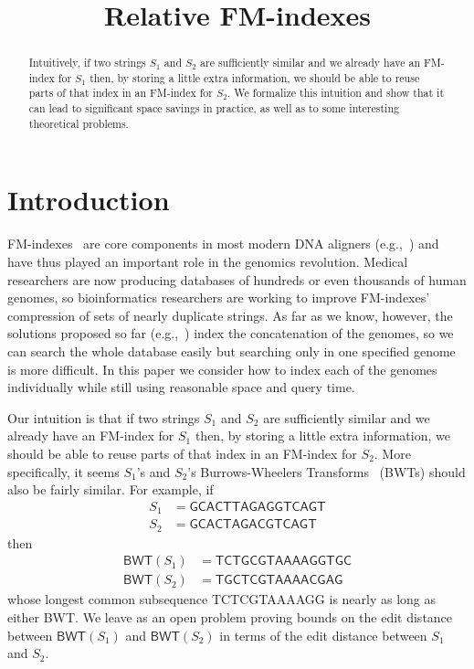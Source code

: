 \documentclass{llncs}
\newcommand{\BWT}
  {\ensuremath{\mathsf{BWT}}}
\begin{document}
\title{Relative FM-indexes}
\maketitle

\begin{abstract}
Intuitively, if two strings $S_1$ and $S_2$ are sufficiently similar and we already have an FM-index for $S_1$ then, by storing a little extra information, we should be able to reuse parts of that index in an FM-index for $S_2$.  We formalize this intuition and show that it can lead to significant space savings in practice, as well as to some interesting theoretical problems.
\end{abstract}


\section{Introduction} \label{sec:introduction}

FM-indexes~\cite{FM05} are core components in most modern DNA aligners (e.g.,~\cite{LTPS09,LD09,LYLLYKW09}) and have thus played an important role in the genomics revolution.  Medical researchers are now producing databases of hundreds or even thousands of human genomes, so bioinformatics researchers are working to improve FM-indexes' compression of sets of nearly duplicate strings.  As far as we know, however, the solutions proposed so far (e.g.,~\cite{FGHP??,MNSV10}) index the concatenation of the genomes, so we can search the whole database easily but searching only in one specified genome is more difficult.  In this paper we consider how to index each of the genomes individually while still using reasonable space and query time.

Our intuition is that if two strings $S_1$ and $S_2$ are sufficiently similar and we already have an FM-index for $S_1$ then, by storing a little extra information, we should be able to reuse parts of that index in an FM-index for $S_2$.  More specifically, it seems $S_1$'s and $S_2$'s Burrows-Wheelers Transforms~\cite{BW94} (BWTs) should also be fairly similar.  For example, if
\begin{align*}
S_1 & = \mathsf{GCACTTAGAGGTCAGT}\\
S_2 & = \mathsf{GCACTAGACGTCAGT}
\end{align*}
then
\begin{align*}
\BWT (S_1) & = \mathsf{TCTGCGTAAAAGGTGC}\\
\BWT (S_2) & = \mathsf{TGCTCGTAAAACGAG}
\end{align*}
whose longest common subsequence {\sf TCTCGTAAAAGG} is nearly as long as either BWT.  We leave as an open problem proving bounds on the edit distance between \(\BWT (S_1)\) and \(\BWT (S_2)\) in terms of the edit distance between $S_1$ and $S_2$.
\end{document}
